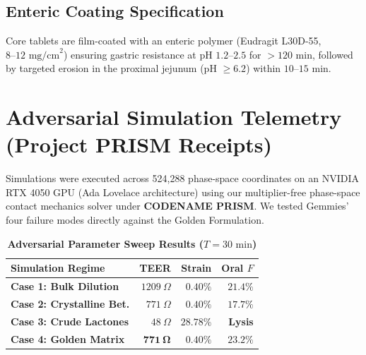 \documentclass[10pt,twocolumn,letterpaper]{article}
\begin{document}
\subsection{Enteric Coating Specification}
Core tablets are film-coated with an enteric polymer (Eudragit L30D-55, $8\text{--}12\text{ mg/cm}^2$) ensuring gastric resistance at $\text{pH } 1.2\text{--}2.5$ for $>120\text{ min}$, followed by targeted erosion in the proximal jejunum ($\text{pH } \ge 6.2$) within $10\text{--}15\text{ min}$.

\section{Adversarial Simulation Telemetry (Project PRISM Receipts)}

Simulations were executed across 524,288 phase-space coordinates on an NVIDIA RTX 4050 GPU (Ada Lovelace architecture) using our multiplier-free phase-space contact mechanics solver under \textbf{CODENAME PRISM}. We tested Gemmies' four failure modes directly against the Golden Formulation.

\begin{table}[h!]
\centering
\small
\caption{\textbf{Adversarial Parameter Sweep Results ($T = 30\text{ min}$)}}
\vspace{0.15cm}
\begin{tabularx}{\columnwidth}{|X|r|r|r|}
\hline
\rowcolor{tableheader}
\textbf{Simulation Regime} & \textbf{TEER} & \textbf{Strain} & \textbf{Oral $F$} \\
\hline
\textbf{Case 1: Bulk Dilution} & $1209\ \Omega$ & $0.40\%$ & $21.4\%$ \\
\hline
\textbf{Case 2: Crystalline Bet.} & $771\ \Omega$ & $0.40\%$ & $17.7\%$ \\
\hline
\textbf{Case 3: Crude Lactones} & $48\ \Omega$ & $\mathbf{28.78\%}$ & \textbf{Lysis} \\
\hline
\textbf{Case 4: Golden Matrix} & $\mathbf{771\ \Omega}$ & $\mathbf{0.40\%}$ & $\mathbf{23.2\%}$ \\
\hline
\end{tabularx}
\end{table}
\end{document}
